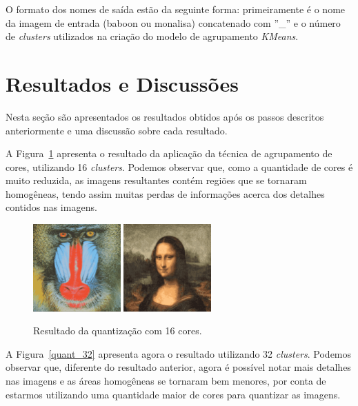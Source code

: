 \documentclass[twoside,twocolumn]{article}
\begin{document}
O formato dos nomes de saída estão da seguinte forma: primeiramente é o nome da imagem de entrada (baboon ou monalisa) concatenado com ''\_'' e o número de \textit{clusters} utilizados na criação do modelo de agrupamento \textit{KMeans}.


\section{Resultados e Discussões}

Nesta seção são apresentados os resultados obtidos após os passos descritos anteriormente e uma discussão sobre cada resultado.

A Figura~\ref{quant_16} apresenta o resultado da aplicação da técnica de agrupamento de cores, utilizando 16 \textit{clusters}. Podemos observar que, como a quantidade de cores é muito reduzida, as imagens resultantes contém regiões que se tornaram homogêneas, tendo assim muitas perdas de informações acerca dos detalhes contidos nas imagens.

\begin{figure}[H]
\begin{center}
	\includegraphics[height=3.35cm]{figures/baboon_16.png} \quad
	\includegraphics[height=3.35cm]{figures/monalisa_16.png}
\caption{Resultado da quantização com 16 cores.} \label{quant_16}
\end{center}
\end{figure}

A Figura~\ref{quant_32} apresenta agora o resultado utilizando 32 \textit{clusters}. Podemos observar que, diferente do resultado anterior, agora é possível notar mais detalhes nas imagens e as áreas homogêneas se tornaram bem menores, por conta de estarmos utilizando uma quantidade maior de cores para quantizar as imagens.
\end{document}
